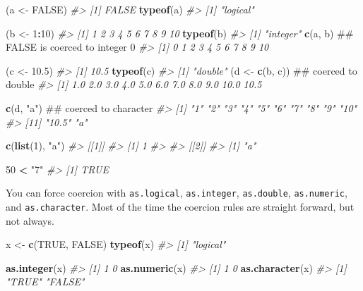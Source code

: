\documentclass[]{book}
\newenvironment{Shaded}{\begin{snugshade}}{\end{snugshade}}
\newcommand{\KeywordTok}[1]{\textcolor[rgb]{0.13,0.29,0.53}{\textbf{#1}}}
\newcommand{\DecValTok}[1]{\textcolor[rgb]{0.00,0.00,0.81}{#1}}
\newcommand{\FloatTok}[1]{\textcolor[rgb]{0.00,0.00,0.81}{#1}}
\newcommand{\StringTok}[1]{\textcolor[rgb]{0.31,0.60,0.02}{#1}}
\newcommand{\CommentTok}[1]{\textcolor[rgb]{0.56,0.35,0.01}{\textit{#1}}}
\newcommand{\OtherTok}[1]{\textcolor[rgb]{0.56,0.35,0.01}{#1}}
\newcommand{\OperatorTok}[1]{\textcolor[rgb]{0.81,0.36,0.00}{\textbf{#1}}}
\newcommand{\NormalTok}[1]{#1}
\theoremstyle{definition}
\theoremstyle{definition}
\theoremstyle{definition}
\theoremstyle{remark}
\begin{document}
\begin{Shaded}
\begin{Highlighting}[]
\NormalTok{(a <-}\StringTok{ }\OtherTok{FALSE}\NormalTok{)}
\CommentTok{#> [1] FALSE}
\KeywordTok{typeof}\NormalTok{(a)}
\CommentTok{#> [1] "logical"}

\NormalTok{(b <-}\StringTok{ }\DecValTok{1}\OperatorTok{:}\DecValTok{10}\NormalTok{)}
\CommentTok{#>  [1]  1  2  3  4  5  6  7  8  9 10}
\KeywordTok{typeof}\NormalTok{(b)}
\CommentTok{#> [1] "integer"}
\KeywordTok{c}\NormalTok{(a, b)         ## FALSE is coerced to integer 0}
\CommentTok{#>  [1]  0  1  2  3  4  5  6  7  8  9 10}

\NormalTok{(c <-}\StringTok{ }\FloatTok{10.5}\NormalTok{)}
\CommentTok{#> [1] 10.5}
\KeywordTok{typeof}\NormalTok{(c)}
\CommentTok{#> [1] "double"}
\NormalTok{(d <-}\StringTok{ }\KeywordTok{c}\NormalTok{(b, c))  ## coerced to double}
\CommentTok{#>  [1]  1.0  2.0  3.0  4.0  5.0  6.0  7.0  8.0  9.0 10.0 10.5}

\KeywordTok{c}\NormalTok{(d, }\StringTok{"a"}\NormalTok{)       ## coerced to character}
\CommentTok{#>  [1] "1"    "2"    "3"    "4"    "5"    "6"    "7"    "8"    "9"    "10"  }
\CommentTok{#> [11] "10.5" "a"}

\KeywordTok{c}\NormalTok{(}\KeywordTok{list}\NormalTok{(}\DecValTok{1}\NormalTok{), }\StringTok{"a"}\NormalTok{)}
\CommentTok{#> [[1]]}
\CommentTok{#> [1] 1}
\CommentTok{#> }
\CommentTok{#> [[2]]}
\CommentTok{#> [1] "a"}

\DecValTok{50} \OperatorTok{<}\StringTok{ "7"}
\CommentTok{#> [1] TRUE}
\end{Highlighting}
\end{Shaded}

You can force coercion with \texttt{as.logical}, \texttt{as.integer},
\texttt{as.double}, \texttt{as.numeric}, and \texttt{as.character}. Most
of the time the coercion rules are straight forward, but not always.

\begin{Shaded}
\begin{Highlighting}[]
\NormalTok{x <-}\StringTok{ }\KeywordTok{c}\NormalTok{(}\OtherTok{TRUE}\NormalTok{, }\OtherTok{FALSE}\NormalTok{)}
\KeywordTok{typeof}\NormalTok{(x)}
\CommentTok{#> [1] "logical"}

\KeywordTok{as.integer}\NormalTok{(x)}
\CommentTok{#> [1] 1 0}
\KeywordTok{as.numeric}\NormalTok{(x)}
\CommentTok{#> [1] 1 0}
\KeywordTok{as.character}\NormalTok{(x)}
\CommentTok{#> [1] "TRUE"  "FALSE"}
\end{Highlighting}
\end{Shaded}
\end{document}
